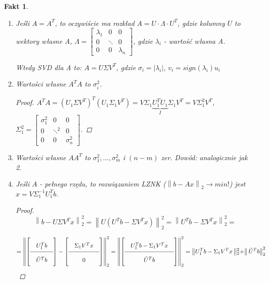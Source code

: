 \documentclass[hidelinks,a4paper,fleqn,oneside]{book}
\newcommand{\ra}{\rightarrow}
\newcommand{\norm}[1]{\left\lVert#1\right\rVert}
\newtheorem{fakt}{Fakt}
\begin{document}
\begin{fakt} $\ $ %
	\begin{enumerate}
		\item Jeśli $A=A^T$, to oczywiście ma rozkład $A = U \cdot \Lambda \cdot U^T$, gdzie kolumny $U$ to wektory własne A, $\Lambda = \begin{bmatrix}
		      \lambda_1 & 0 & 0\\ 
		      0 & \ddots & 0\\ 
		      0 & 0 & \lambda_n 
		\end{bmatrix}$, gdzie $\lambda_i$ - wartość własna A.
		
		Wtedy SVD dla A to:
		$A = U\Sigma V^T$, gdzie $\sigma_i = |\lambda_i|$, $v_i = sign(\lambda_i)u_i$
		 			
		\item Wartości własne $A^TA$ to $\sigma_i^2$.
		       			
	      \begin{proof}
	       	$A^TA = (U_1\Sigma V^T)^T(U_1 \Sigma_1 V^T) = V \Sigma_1 \underbrace{U_1^T U_1 }_{I} \Sigma_1 V^T = V \Sigma_1^2V^T$, $\Sigma_1^2 = \begin{bmatrix}
		      \sigma_1^2 & 0 & 0\\
		      0 & \ddots^2 & 0\\ 
		      0 & 0 & \sigma_n^2
			\end{bmatrix}$.
		\end{proof}
				
		\item Wartości własne $AA^T$ to $\sigma_1^2, ..., \sigma_m^2$ i $(n-m)$ zer.
		      Dowód: analogicznie jak 2.
		      		
		\item Jeśli $A$ - pełnego rzędu, to rozwiązaniem LZNK ($\norm{b - Ax}_2 \ra min!$) jest $x = V\Sigma_1^{-1} U_1^Tb$.
		      		
		      \begin{proof}
		      \[
		      	\norm{b - U\Sigma V^Tx} _2 ^2 = \norm{U(U^Tb - \Sigma V^Tx)}_2^2 = \norm{U^Tb - \Sigma V^Tx}_2^2 =
		      	\]
		      	
		      	\[\arraycolsep=1em\def\arraystretch{2} = \norm{\left[\begin{array}{c}
		      	U_1^Tb\\ 
		      	\hline
		      	\tilde{U}^Tb
		      	\end{array}\right] - \left[\begin{array}{c}\Sigma_1V^Tx\\ \hline 0 \end{array}\right]}_2^2 = \norm{\left[\begin{array}{c}U_1^Tb - \Sigma_1V^Tx\\ \hline \tilde{U}^Tb \end{array}\right]}_2^2 =\norm{U_1^Tb - \Sigma_1V^Tx\norm{_2^2 +} \tilde{U}^Tb}_2^2
		      \]
		      

\end{proof}
\end{enumerate}
\end{fakt}
\end{document}
